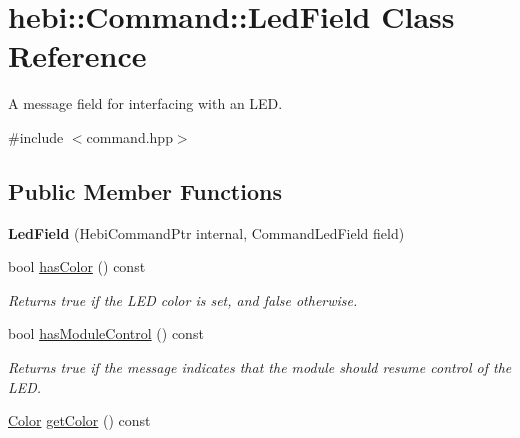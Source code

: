 \hypertarget{classhebi_1_1Command_1_1LedField}{}\section{hebi\+:\+:Command\+:\+:Led\+Field Class Reference}
\label{classhebi_1_1Command_1_1LedField}


A message field for interfacing with an L\+ED.  




{\ttfamily \#include $<$command.\+hpp$>$}

\subsection*{Public Member Functions}
\begin{DoxyCompactItemize}
\item 
{\bfseries Led\+Field} (Hebi\+Command\+Ptr internal, Command\+Led\+Field field)\hypertarget{classhebi_1_1Command_1_1LedField_a51c1a35f4ca0dc607f9627abebaaad5e}{}\label{classhebi_1_1Command_1_1LedField_a51c1a35f4ca0dc607f9627abebaaad5e}

\item 
bool \hyperlink{classhebi_1_1Command_1_1LedField_a28b30332afd8b31555f5fc75e4b1a44e}{has\+Color} () const \hypertarget{classhebi_1_1Command_1_1LedField_a28b30332afd8b31555f5fc75e4b1a44e}{}\label{classhebi_1_1Command_1_1LedField_a28b30332afd8b31555f5fc75e4b1a44e}

\begin{DoxyCompactList}\small\item\em Returns true if the L\+ED color is set, and false otherwise. \end{DoxyCompactList}\item 
bool \hyperlink{classhebi_1_1Command_1_1LedField_aae7b88394b6663c44e7cba94de51a7f3}{has\+Module\+Control} () const 
\begin{DoxyCompactList}\small\item\em Returns true if the message indicates that the module should resume control of the L\+ED. \end{DoxyCompactList}\item 
\hyperlink{structhebi_1_1Color}{Color} \hyperlink{classhebi_1_1Command_1_1LedField_a25c5054826a59ff3b314998d287e8feb}{get\+Color} () const \hypertarget{classhebi_1_1Command_1_1LedField_a25c5054826a59ff3b314998d287e8feb}{}\label{classhebi_1_1Command_1_1LedField_a25c5054826a59ff3b314998d287e8feb}


\end{DoxyCompactItemize}
